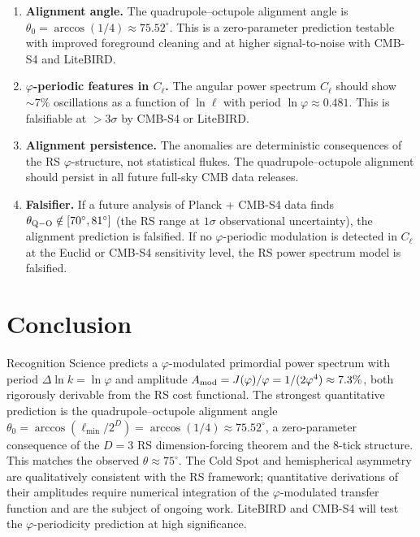 \documentclass[12pt,a4paper]{article}
\theoremstyle{definition}
\theoremstyle{remark}
\begin{document}
\begin{enumerate}
  \item \textbf{Alignment angle.}  The quadrupole--octupole alignment
  angle is $\theta_0 = \arccos(1/4) \approx 75.52^\circ$.  This is a
  zero-parameter prediction testable with improved foreground cleaning
  and at higher signal-to-noise with CMB-S4 and LiteBIRD.

  \item \textbf{$\varphi$-periodic features in $C_\ell$.}  The angular
  power spectrum $C_\ell$ should show $\sim 7\%$ oscillations as a
  function of $\ln\ell$ with period $\ln\varphi \approx 0.481$.  This
  is falsifiable at $> 3\sigma$ by CMB-S4 or LiteBIRD.

  \item \textbf{Alignment persistence.}  The anomalies are deterministic
  consequences of the RS $\varphi$-structure, not statistical flukes.
  The quadrupole--octupole alignment should persist in all future
  full-sky CMB data releases.

  \item \textbf{Falsifier.}  If a future analysis of Planck + CMB-S4
  data finds $\theta_{\rm Q-O} \notin [70^\circ, 81^\circ]$ (the RS
  range at $1\sigma$ observational uncertainty), the alignment
  prediction is falsified.  If no $\varphi$-periodic modulation is
  detected in $C_\ell$ at the Euclid or CMB-S4 sensitivity level, the
  RS power spectrum model is falsified.
\end{enumerate}

\section{Conclusion}
\label{sec:conclusion}

Recognition Science predicts a $\varphi$-modulated primordial power
spectrum with period $\Delta\ln k = \ln\varphi$ and amplitude
$A_{\rm mod} = J(\varphi)/\varphi = 1/(2\varphi^4) \approx 7.3\%$,
both rigorously derivable from the RS cost functional.  The strongest
quantitative prediction is the quadrupole--octupole alignment angle
$\theta_0 = \arccos(\ell_{\min}/2^D) = \arccos(1/4) \approx 75.52^\circ$,
a zero-parameter consequence of the $D = 3$ RS dimension-forcing theorem
and the 8-tick structure.  This matches the observed $\theta \approx
75^\circ$.  The Cold Spot and hemispherical asymmetry are qualitatively
consistent with the RS framework; quantitative derivations of their
amplitudes require numerical integration of the $\varphi$-modulated
transfer function and are the subject of ongoing work.  LiteBIRD and
CMB-S4 will test the $\varphi$-periodicity prediction at high
significance.
\end{document}
